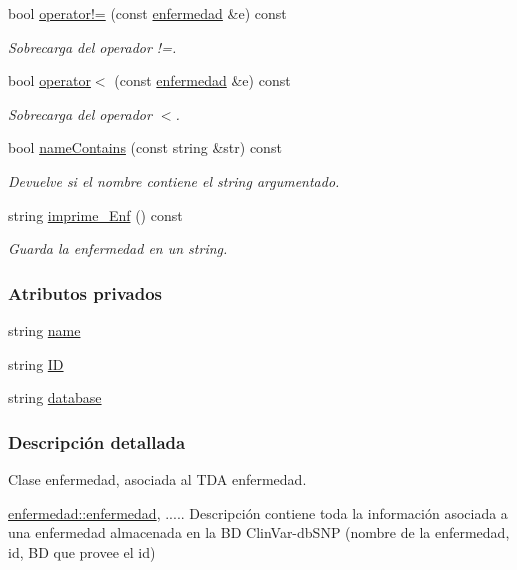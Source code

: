 \begin{DoxyCompactItemize}
bool \hyperlink{classenfermedad_a85bf5cbb035fd4712ff9a72188060e5c}{operator!=} (const \hyperlink{classenfermedad}{enfermedad} \&e) const 
\begin{DoxyCompactList}\small\item\em Sobrecarga del operador !=. \end{DoxyCompactList}\item 
bool \hyperlink{classenfermedad_a2b3361849fa17dc88be561cd4233d584}{operator$<$} (const \hyperlink{classenfermedad}{enfermedad} \&e) const 
\begin{DoxyCompactList}\small\item\em Sobrecarga del operador $<$. \end{DoxyCompactList}\item 
bool \hyperlink{classenfermedad_a31f2b1bed5745d9f00f3e567c04e68af}{name\-Contains} (const string \&str) const 
\begin{DoxyCompactList}\small\item\em Devuelve si el nombre contiene el string argumentado. \end{DoxyCompactList}\item 
string \hyperlink{classenfermedad_a6ccf826b31d127d8f45560955fdf5be4}{imprime\-\_\-\-Enf} () const 
\begin{DoxyCompactList}\small\item\em Guarda la enfermedad en un string. \end{DoxyCompactList}\end{DoxyCompactItemize}
\subsubsection*{Atributos privados}
\begin{DoxyCompactItemize}
\item 
string \hyperlink{classenfermedad_ad7c4204057028a73bde6022678c6813e}{name}
\item 
string \hyperlink{classenfermedad_a689cdbd469ecc28e045bda2f62a229d2}{I\-D}
\item 
string \hyperlink{classenfermedad_a3684b7ec850d4c9357dd21bdd5e02803}{database}
\end{DoxyCompactItemize}


\subsubsection{Descripción detallada}
Clase enfermedad, asociada al T\-D\-A enfermedad. 

\hyperlink{classenfermedad_a60eb5e620b0bf9a53d4f0980031aeefd}{enfermedad\-::enfermedad}, ..... Descripción contiene toda la información asociada a una enfermedad almacenada en la B\-D Clin\-Var-\/db\-S\-N\-P (nombre de la enfermedad, id, B\-D que provee el id)


